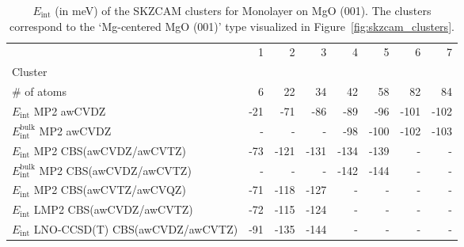 \begin{table}
\caption{\label{tab:system_eint_mgo_c2h6_monolayer}$E_\textrm{int}$ (in meV) of the SKZCAM clusters for Monolayer  on MgO (001). The clusters correspond to the `Mg-centered MgO (001)' type visualized in Figure~\ref{fig:skzcam_clusters}.}
\begin{adjustbox}{center,max width=1.4\textwidth}
\begin{tabular}{lrrrrrrr}
\toprule
 & 1 & 2 & 3 & 4 & 5 & 6 & 7 \\ 
Cluster &  &  &  &  &  &  &  \\
\midrule
\# of atoms & 6 & 22 & 34 & 42 & 58 & 82 & 84 \\
$E_\textrm{int}$ MP2 awCVDZ & -21 & -71 & -86 & -89 & -96 & -101 & -102 \\
$E_\textrm{int}^\textrm{bulk}$ MP2 awCVDZ & - & - & - & -98 & -100 & -102 & -103 \\
$E_\textrm{int}$ MP2 CBS(awCVDZ/awCVTZ) & -73 & -121 & -131 & -134 & -139 & - & - \\
$E_\textrm{int}^\textrm{bulk}$ MP2 CBS(awCVDZ/awCVTZ) & - & - & - & -142 & -144 & - & - \\
$E_\textrm{int}$ MP2 CBS(awCVTZ/awCVQZ) & -71 & -118 & -127 & - & - & - & - \\
$E_\textrm{int}$ LMP2 CBS(awCVDZ/awCVTZ) & -72 & -115 & -124 & - & - & - & - \\
$E_\textrm{int}$ LNO-CCSD(T) CBS(awCVDZ/awCVTZ) & -91 & -135 & -144 & - & - & - & - \\
\bottomrule
\end{tabular}
\end{adjustbox}
\end{table}

